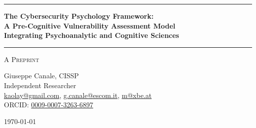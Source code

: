 \documentclass[11pt,a4paper]{article}
\begin{document}
\thispagestyle{empty}
\begin{center}

\vspace*{0.5cm}

\rule{\textwidth}{1.5pt}

\vspace{0.5cm}

{\LARGE \textbf{The Cybersecurity Psychology Framework:}}\\[0.3cm]
{\LARGE \textbf{A Pre-Cognitive Vulnerability Assessment Model}}\\[0.3cm]
{\LARGE \textbf{Integrating Psychoanalytic and Cognitive Sciences}}

\vspace{0.5cm}

\rule{\textwidth}{1.5pt}

\vspace{0.3cm}

{\large \textsc{A Preprint}}

\vspace{0.5cm}

{\Large Giuseppe Canale, CISSP}\\[0.2cm]
Independent Researcher\\[0.1cm]
\href{mailto:kaolay@gmail.com}{kaolay@gmail.com}, 
\href{mailto:g.canale@escom.it}{g.canale@escom.it}, 
\href{mailto:m@xbe.at}{m@xbe.at}\\[0.1cm]
ORCID: \href{https://orcid.org/0009-0007-3263-6897}{0009-0007-3263-6897}

\vspace{0.8cm}

{\large \today}

\vspace{1cm}

\end{center}
\end{document}
